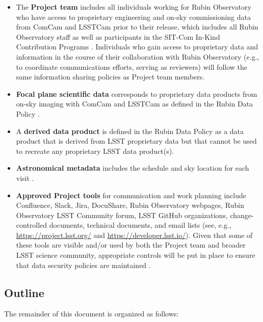 \documentclass[SE,authoryear,toc]{lsstdoc}
\begin{document}
\begin{itemize}

  \item The \textbf{Project team} includes all individuals working for Rubin Observatory who have access to proprietary engineering and on-sky commissioning data from ComCam and LSSTCam prior to their release, which includes all Rubin Observatory staff as well as participants in the SIT-Com In-Kind Contribution Programs .
  Individuals who gain access to proprietary data and information in the course of their collaboration with Rubin Observatory (e.g., to coordinate communications efforts, serving as reviewers) will follow the same information sharing policies as Project team members.

  \item \textbf{Focal plane scientific data} corresponds to proprietary data products from on-sky imaging with ComCam and LSSTCam as defined in the Rubin Data Policy .

  \item A \textbf{derived data product} is defined in the Rubin Data Policy  as a data product that is derived from LSST proprietary data but that cannot be used to recreate any proprietary LSST data product(s).

  \item \textbf{Astronomical metadata} includes the schedule and sky location for each visit .

  \item \textbf{Approved Project tools} for communication and work planning include Confluence, Slack, Jira, DocuShare, Rubin Observatory webpages, Rubin Observatory LSST Community forum, LSST GitHub organizations, change-controlled documents, technical documents, and email lists (see, e.g., \url{https://project.lsst.org/} and \url{https://developer.lsst.io/}).
  Given that some of these tools are visible and/or used by both the Project team and broader LSST science community, appropriate controls will be put in place to ensure that data security policies are maintained .

\end{itemize}

\subsection{Outline}

The remainder of this document is organized as follows:
\end{document}
